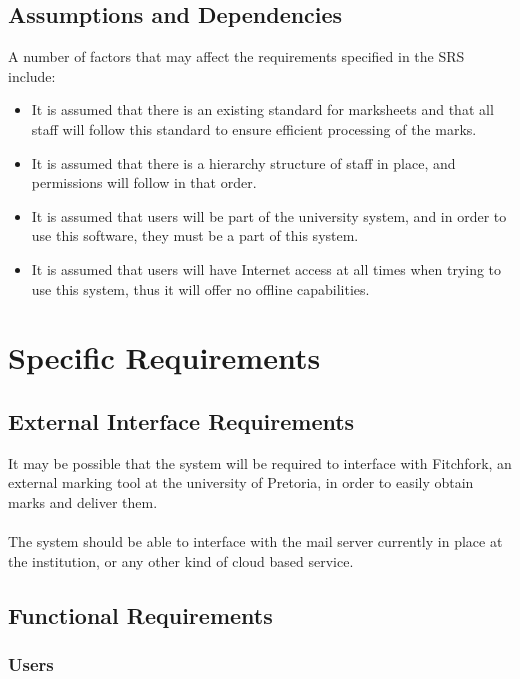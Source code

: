 \documentclass[a4paper,12pt]{article}
\begin{document}
        \subsection{Assumptions and Dependencies}
        A number of factors that may affect the requirements specified in the SRS include:
        \begin{itemize}
        	\item It is assumed that there is an existing standard for marksheets and that all staff will follow this standard to ensure efficient processing of the marks.
        	\item It is assumed that there is a hierarchy structure of staff in place, and permissions will follow in that order. 
        	\item It is assumed that users will be part of the university system, and in order to use this software, they must be a part of this system.
        	\item It is assumed that users will have Internet access at all times when trying to use this system, thus it will offer no offline capabilities.
        	
        \end{itemize}
    
    	\pagebreak
    	    	
    	\section{Specific Requirements}
    
    	\subsection{External Interface Requirements}
    	
    	It may be possible that the system will be required to interface with Fitchfork, an external marking tool at the university of Pretoria, in order to easily obtain marks and deliver them.\\\\	
    	The system should be able to interface with the mail server currently in place at the institution, or any other kind of cloud based service.
    	
        \subsection{Functional Requirements}
        
        	\subsubsection{Users}
        	
\end{document}
